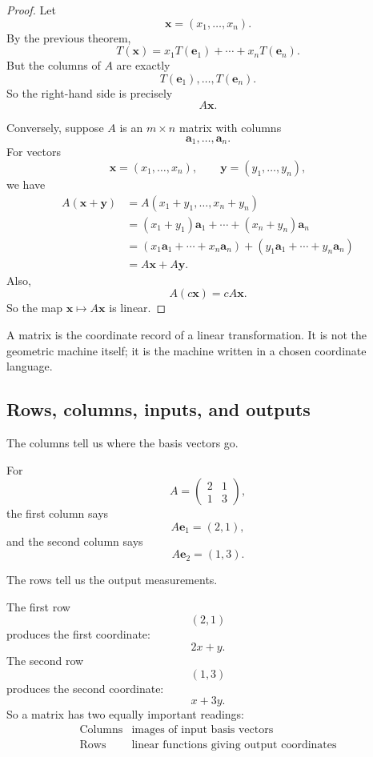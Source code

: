 \begin{proof}
Let
\[
    \mathbf x=(x_1,\ldots,x_n).
\]
By the previous theorem,
\[
    T(\mathbf x)
    =
    x_1T(\mathbf e_1)+\cdots+x_nT(\mathbf e_n).
\]
But the columns of \(A\) are exactly
\[
    T(\mathbf e_1),\ldots,T(\mathbf e_n).
\]
So the right-hand side is precisely
\[
    A\mathbf x.
\]

Conversely, suppose \(A\) is an \(m\times n\) matrix with columns
\[
    \mathbf a_1,\ldots,\mathbf a_n.
\]
For vectors
\[
    \mathbf x=(x_1,\ldots,x_n),
    \qquad
    \mathbf y=(y_1,\ldots,y_n),
\]
we have
\[
\begin{aligned}
A(\mathbf x+\mathbf y)
&=
A(x_1+y_1,\ldots,x_n+y_n)\\
&=
(x_1+y_1)\mathbf a_1+\cdots+(x_n+y_n)\mathbf a_n\\
&=
(x_1\mathbf a_1+\cdots+x_n\mathbf a_n)
+
(y_1\mathbf a_1+\cdots+y_n\mathbf a_n)\\
&=
A\mathbf x+A\mathbf y.
\end{aligned}
\]
Also,
\[
    A(c\mathbf x)=cA\mathbf x.
\]
So the map \(\mathbf x\mapsto A\mathbf x\) is linear.
\end{proof}

A matrix is the coordinate record of a linear transformation.  It is not the geometric
machine itself; it is the machine written in a chosen coordinate language.

\subsection{Rows, columns, inputs, and outputs}

The columns tell us where the basis vectors go.

For
\[
    A=
    \begin{pmatrix}
        2&1\\
        1&3
    \end{pmatrix},
\]
the first column says
\[
    A\mathbf e_1=(2,1),
\]
and the second column says
\[
    A\mathbf e_2=(1,3).
\]

The rows tell us the output measurements.

The first row
\[
    (2,1)
\]
produces the first coordinate:
\[
    2x+y.
\]
The second row
\[
    (1,3)
\]
produces the second coordinate:
\[
    x+3y.
\]
So a matrix has two equally important readings:
\[
\begin{array}{c|c}
\text{Columns} & \text{images of input basis vectors}\\ \hline
\text{Rows} & \text{linear functions giving output coordinates}
\end{array}
\]

